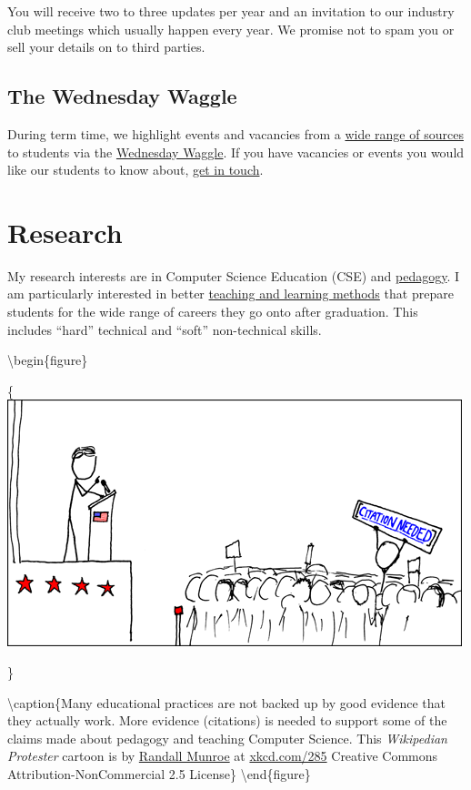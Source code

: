 \documentclass[12pt,]{book}
\begin{document}
You will receive two to three updates per year and an invitation to our industry club meetings which usually happen every year. We promise not to spam you or sell your details on to third parties.

\hypertarget{the-wednesday-waggle}{%
\section{The Wednesday Waggle}\label{the-wednesday-waggle}}

During term time, we highlight events and vacancies from a \href{http://dullhunk.github.io/where-can-I-look-for-jobs.html}{wide range of sources} to students via the \href{https://waggle.cs.manchester.ac.uk/waggle/about}{Wednesday Waggle}. If you have vacancies or events you would like our students to know about, \protect\hyperlink{contact}{get in touch}.

\hypertarget{research}{%
\chapter{Research}\label{research}}

My research interests are in Computer Science Education (CSE) and \href{https://en.wikipedia.org/wiki/Pedagogy}{pedagogy}. I am particularly interested in better \href{https://www.manchester.ac.uk/study/undergraduate/teaching-learning/}{teaching and learning methods} that prepare students for the wide range of careers they go onto after graduation. This includes ``hard'' technical and ``soft'' non-technical skills.

\textbackslash{}begin\{figure\}

\{\centering \includegraphics[width=0.7\linewidth]{images/wikipedian_protester}

\}

\textbackslash{}caption\{Many educational practices are not backed up by good evidence that they actually work. More evidence (citations) is needed to support some of the claims made about pedagogy and teaching Computer Science. This \emph{Wikipedian Protester} cartoon is by \href{https://en.wikipedia.org/wiki/Randall_Munroe}{Randall Munroe} at \href{https://xkcd.com/285/}{xkcd.com/285} Creative Commons Attribution-NonCommercial 2.5 License\}\label{fig:unnamed-chunk-2}
\textbackslash{}end\{figure\}
\end{document}
